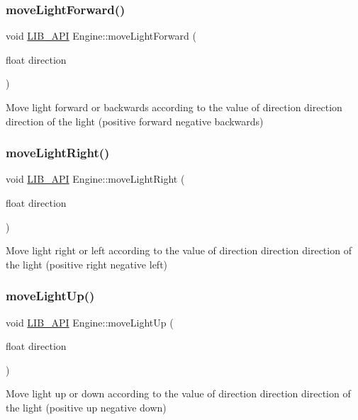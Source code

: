\subsubsection{\texorpdfstring{move\+Light\+Forward()}{moveLightForward()}}
{\footnotesize\ttfamily void \hyperlink{Engine_8h_a77278c8cc96e39fb27b5d0a347c8fb3d}{L\+I\+B\+\_\+\+A\+PI} Engine\+::move\+Light\+Forward (\begin{DoxyParamCaption}\item[{float}]{direction }\end{DoxyParamCaption})}

Move light forward or backwards according to the value of direction direction direction of the light (positive forward negative backwards) \mbox{\label{classEngine_a39722483f0ab212c1f240607b79984a8}} 
\subsubsection{\texorpdfstring{move\+Light\+Right()}{moveLightRight()}}
{\footnotesize\ttfamily void \hyperlink{Engine_8h_a77278c8cc96e39fb27b5d0a347c8fb3d}{L\+I\+B\+\_\+\+A\+PI} Engine\+::move\+Light\+Right (\begin{DoxyParamCaption}\item[{float}]{direction }\end{DoxyParamCaption})}

Move light right or left according to the value of direction direction direction of the light (positive right negative left) \mbox{\label{classEngine_a9af1747c316912a33e2300a6a2dd4904}} 
\subsubsection{\texorpdfstring{move\+Light\+Up()}{moveLightUp()}}
{\footnotesize\ttfamily void \hyperlink{Engine_8h_a77278c8cc96e39fb27b5d0a347c8fb3d}{L\+I\+B\+\_\+\+A\+PI} Engine\+::move\+Light\+Up (\begin{DoxyParamCaption}\item[{float}]{direction }\end{DoxyParamCaption})}

Move light up or down according to the value of direction direction direction of the light (positive up negative down) \mbox{\label{classEngine_a1189f12688d8c4df96e8e2fd4574e3ea}} 
